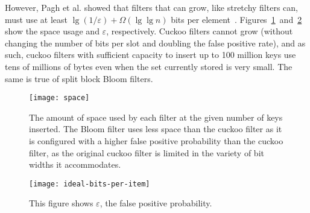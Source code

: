 \documentclass[letterpaper,twocolumn,10pt]{article}
\newcommand{\etal}{et al.}
\newcommand{\taffy}{stretchy}
\newcommand{\TBF}{SBF}
\newcommand{\TCF}{SCF}
\newcommand{\MTCF}{MSCF}
\newcommand{\taffy}{taffy}
\newcommand{\TBF}{TBF}
\newcommand{\TCF}{TCF}
\newcommand{\MTCF}{MTCF}
\begin{document}
However, Pagh \etal{} showed that filters that can grow, like \taffy{} filters can, must use at least $\lg (1/\varepsilon) + \Omega(\lg \lg n)$ bits per element~\cite{psw}.
Figures~\ref{space-steps}~and~\ref{ideal-bits-per-item} show the space usage and $\varepsilon$, respectively.
Cuckoo filters cannot grow (without changing the number of bits per slot and doubling the false positive rate), and as such, cuckoo filters with sufficient capacity to insert up to 100 million keys use tens of millions of bytes even when the set currently stored is very small.
The same is true of split block Bloom filters.










\begin{figure}[b!]
  \texttt{[image: space]}
  \caption{
    \label{space-steps}
    The amount of space used by each filter at the given number of keys inserted.
    The Bloom filter uses less space than the cuckoo filter as it is configured with a higher false positive probability than the cuckoo filter, as the original cuckoo filter is limited in the variety of bit widths it accommodates.
  }
\end{figure}

\begin{figure}[b!]
  \texttt{[image: ideal-bits-per-item]}
  \caption{  \label{ideal-bits-per-item}
    This figure shows $\varepsilon$, the false positive probability.
  }
\end{figure}
\end{document}
